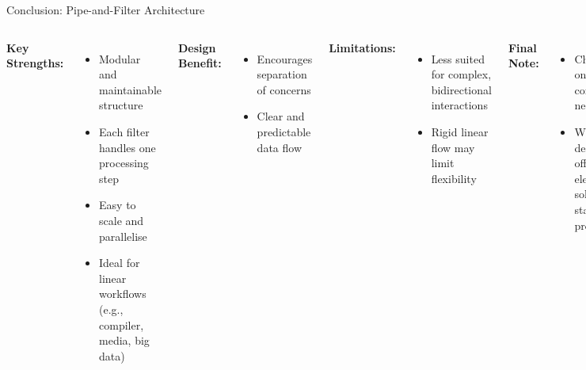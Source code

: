 \documentclass[aspectratio=169, table]{beamer}
\begin{document}
\begin{frame}[fragile]{Conclusion: Pipe-and-Filter Architecture}
	\vspace{20pt}
	\begin{columns}[T]
		\textbf{Key Strengths:}
		\begin{itemize}
			\item Modular and maintainable structure
			\item Each filter handles one processing step
			\item Easy to scale and parallelise
			\item Ideal for linear workflows (e.g., compiler, media, big data)
		\end{itemize}
		
		\textbf{Design Benefit:}
		\begin{itemize}
			\item Encourages separation of concerns
			\item Clear and predictable data flow
		\end{itemize}
		
		\textbf{Limitations:}
		\begin{itemize}
			\item Less suited for complex, bidirectional interactions
			\item Rigid linear flow may limit flexibility
		\end{itemize}
		
		\textbf{Final Note:}
		\begin{itemize}
			\item Choose based on domain and communication needs
			\item With proper design, it offers an elegant solution for staged processing
		\end{itemize}
	\end{columns}
\end{frame}
\end{document}
